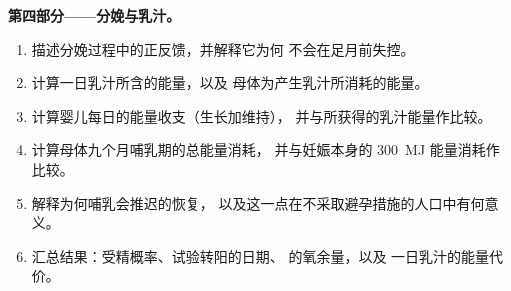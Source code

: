 \begin{problem}
\medskip
\noindent\textbf{第四部分——分娩与乳汁。}
\begin{enumerate}[resume]
  \item 描述分娩过程中的正反馈，并解释它为何
        不会在足月前失控。
  \item 计算一日乳汁所含的能量，以及
        母体为产生乳汁所消耗的能量。
  \item 计算婴儿每日的能量收支（生长加维持），
        并与所获得的乳汁能量作比较。
  \item 计算母体九个月哺乳期的总能量消耗，
        并与妊娠本身的
        \qty{300}{MJ} 能量消耗作比较。
  \item 解释为何哺乳会推迟的恢复，
        以及这一点在不采取避孕措施的人口中有何意义。
  \item 汇总结果：受精概率、试验转阳的日期、
        的氧余量，以及
        一日乳汁的能量代价。
\end{enumerate}
\end{problem}
